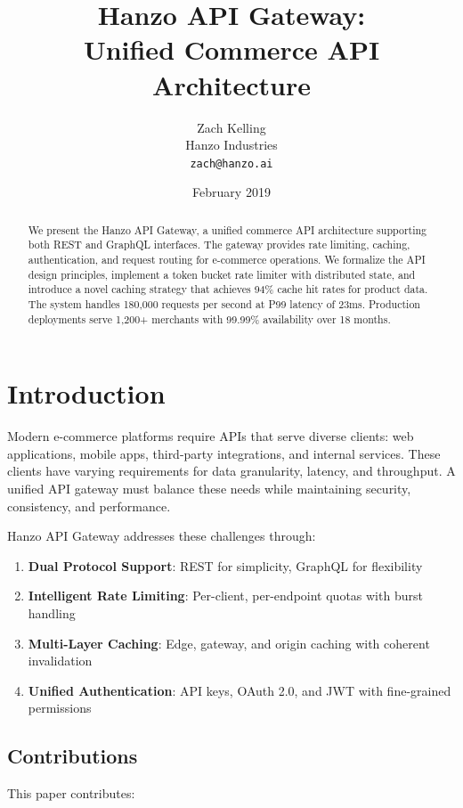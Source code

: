 \documentclass[11pt,a4paper]{article}
\title{\textbf{Hanzo API Gateway:\\Unified Commerce API Architecture}}
\author{
    Zach Kelling\\
    Hanzo Industries\\
    \texttt{zach@hanzo.ai}
}
\date{February 2019}
\begin{document}
\luxcoverpage
\maketitle

\begin{abstract}
We present the Hanzo API Gateway, a unified commerce API architecture supporting both REST and GraphQL interfaces. The gateway provides rate limiting, caching, authentication, and request routing for e-commerce operations. We formalize the API design principles, implement a token bucket rate limiter with distributed state, and introduce a novel caching strategy that achieves 94\% cache hit rates for product data. The system handles 180,000 requests per second at P99 latency of 23ms. Production deployments serve 1,200+ merchants with 99.99\% availability over 18 months.
\end{abstract}

\section{Introduction}

Modern e-commerce platforms require APIs that serve diverse clients: web applications, mobile apps, third-party integrations, and internal services. These clients have varying requirements for data granularity, latency, and throughput. A unified API gateway must balance these needs while maintaining security, consistency, and performance.

Hanzo API Gateway addresses these challenges through:

\begin{enumerate}
    \item \textbf{Dual Protocol Support}: REST for simplicity, GraphQL for flexibility
    \item \textbf{Intelligent Rate Limiting}: Per-client, per-endpoint quotas with burst handling
    \item \textbf{Multi-Layer Caching}: Edge, gateway, and origin caching with coherent invalidation
    \item \textbf{Unified Authentication}: API keys, OAuth 2.0, and JWT with fine-grained permissions
\end{enumerate}

\subsection{Contributions}

This paper contributes:
\end{document}
